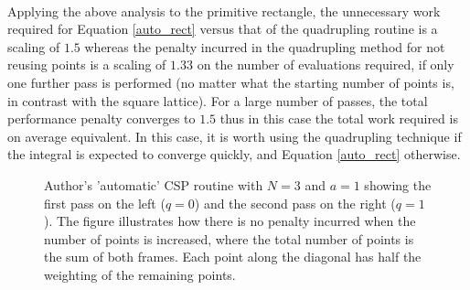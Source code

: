 \documentclass[a4paper, 12pt]{article}
\begin{document}
	\\\par Applying the above analysis to the primitive rectangle, the unnecessary work required for Equation \eqref{auto_rect} versus that of the quadrupling routine is a scaling of $1.5$ whereas the penalty incurred in the quadrupling method for not reusing points is a scaling of $1.33$ on the number of evaluations required, if only one further pass is performed (no matter what the starting number of points is, in contrast with the square lattice). For a large number of passes, the total performance penalty converges to $1.5$ thus in this case the total work required is on average equivalent. In this case, it is worth using the quadrupling technique if the integral is expected to converge quickly, and Equation \eqref{auto_rect} otherwise.
\pgfplotsset{width=3in}
\pgfplotsset{height=3in}
	\tikzset{external/export next=false}
\begin{figure}[H]
\caption{\footnotesize
Author's 'automatic' CSP routine with $N = 3$ and $a=1$ showing the first pass on the left ($q=0$) and the second pass on the right ($q=1$). The figure illustrates how there is no penalty incurred when the number of points is increased, where the total number of points is the sum of both frames. Each point along the diagonal has half the weighting of the remaining points.}
\end{figure}
\end{document}
